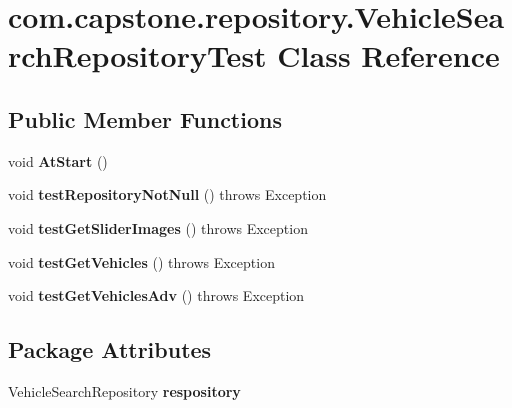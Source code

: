 \hypertarget{classcom_1_1capstone_1_1repository_1_1_vehicle_search_repository_test}{}\section{com.\+capstone.\+repository.\+Vehicle\+Search\+Repository\+Test Class Reference}
\label{classcom_1_1capstone_1_1repository_1_1_vehicle_search_repository_test}
\subsection*{Public Member Functions}
\begin{DoxyCompactItemize}
\item 
\mbox{\label{classcom_1_1capstone_1_1repository_1_1_vehicle_search_repository_test_a8ff66573830afd670ed3cf3ea3d4a204}} 
void {\bfseries At\+Start} ()
\item 
\mbox{\label{classcom_1_1capstone_1_1repository_1_1_vehicle_search_repository_test_a1a73304abb5016d980ad13d6e8552b2b}} 
void {\bfseries test\+Repository\+Not\+Null} ()  throws Exception 
\item 
\mbox{\label{classcom_1_1capstone_1_1repository_1_1_vehicle_search_repository_test_abef98ef79893b8153acbf034e70ce0e1}} 
void {\bfseries test\+Get\+Slider\+Images} ()  throws Exception 
\item 
\mbox{\label{classcom_1_1capstone_1_1repository_1_1_vehicle_search_repository_test_a8985b3e4a773f35c2658a9224545d2ed}} 
void {\bfseries test\+Get\+Vehicles} ()  throws Exception 
\item 
\mbox{\label{classcom_1_1capstone_1_1repository_1_1_vehicle_search_repository_test_af44a0552b32c5d0188c87f0482fab531}} 
void {\bfseries test\+Get\+Vehicles\+Adv} ()  throws Exception 
\end{DoxyCompactItemize}
\subsection*{Package Attributes}
\begin{DoxyCompactItemize}
\item 
\mbox{\label{classcom_1_1capstone_1_1repository_1_1_vehicle_search_repository_test_a92b6a8d7ae61b39b82065067f08e56dd}} 
Vehicle\+Search\+Repository {\bfseries respository}
\end{DoxyCompactItemize}


